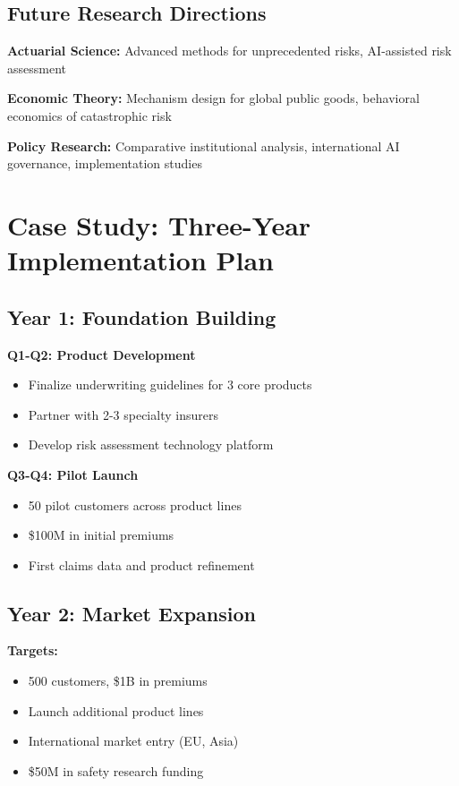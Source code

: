 \documentclass[11pt]{article}
\begin{document}
\subsection{Future Research Directions}

\textbf{Actuarial Science:} Advanced methods for unprecedented risks, AI-assisted risk assessment

\textbf{Economic Theory:} Mechanism design for global public goods, behavioral economics of catastrophic risk

\textbf{Policy Research:} Comparative institutional analysis, international AI governance, implementation studies

\section{Case Study: Three-Year Implementation Plan}

\subsection{Year 1: Foundation Building}

\textbf{Q1-Q2: Product Development}
\begin{itemize}
   \item Finalize underwriting guidelines for 3 core products
   \item Partner with 2-3 specialty insurers
   \item Develop risk assessment technology platform
\end{itemize}

\textbf{Q3-Q4: Pilot Launch}
\begin{itemize}
   \item 50 pilot customers across product lines
   \item \$100M in initial premiums
   \item First claims data and product refinement
\end{itemize}

\subsection{Year 2: Market Expansion}

\textbf{Targets:}
\begin{itemize}
   \item 500 customers, \$1B in premiums
   \item Launch additional product lines
   \item International market entry (EU, Asia)
   \item \$50M in safety research funding
\end{itemize}
\end{document}
